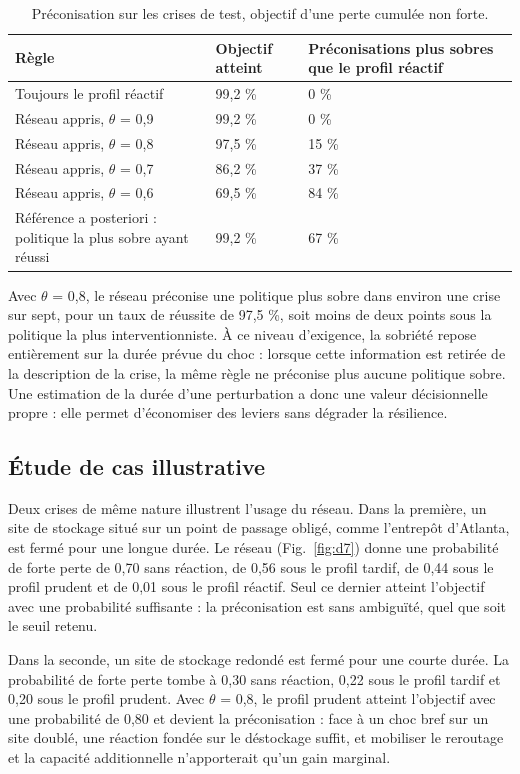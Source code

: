 \begin{table}[htbp]
\caption{Préconisation sur les crises de test, objectif d'une perte cumulée non forte.}
\label{tab:d15}
\footnotesize
\begin{tabularx}{\textwidth}{@{}LLL@{}}
\toprule
\textbf{Règle} & \textbf{Objectif atteint} & \textbf{Préconisations plus sobres que le profil réactif} \\
\midrule
Toujours le profil réactif & 99,2 \% & 0 \% \\
Réseau appris, $\theta$ = 0,9 & 99,2 \% & 0 \% \\
Réseau appris, $\theta$ = 0,8 & 97,5 \% & 15 \% \\
Réseau appris, $\theta$ = 0,7 & 86,2 \% & 37 \% \\
Réseau appris, $\theta$ = 0,6 & 69,5 \% & 84 \% \\
Référence a posteriori : politique la plus sobre ayant réussi & 99,2 \% & 67 \% \\
\bottomrule
\end{tabularx}
\end{table}

Avec $\theta$ = 0,8, le réseau préconise une politique plus sobre dans environ une crise sur sept, pour un taux de réussite de 97,5 \%, soit moins de deux points sous la politique la plus interventionniste. À ce niveau d'exigence, la sobriété repose entièrement sur la durée prévue du choc : lorsque cette information est retirée de la description de la crise, la même règle ne préconise plus aucune politique sobre. Une estimation de la durée d'une perturbation a donc une valeur décisionnelle propre : elle permet d'économiser des leviers sans dégrader la résilience.

\subsection{Étude de cas illustrative}
\label{sec:6.4}

Deux crises de même nature illustrent l'usage du réseau. Dans la première, un site de stockage situé sur un point de passage obligé, comme l'entrepôt d'Atlanta, est fermé pour une longue durée. Le réseau (Fig.~\ref{fig:d7}) donne une probabilité de forte perte de 0,70 sans réaction, de 0,56 sous le profil tardif, de 0,44 sous le profil prudent et de 0,01 sous le profil réactif. Seul ce dernier atteint l'objectif avec une probabilité suffisante : la préconisation est sans ambiguïté, quel que soit le seuil retenu.

Dans la seconde, un site de stockage redondé est fermé pour une courte durée. La probabilité de forte perte tombe à 0,30 sans réaction, 0,22 sous le profil tardif et 0,20 sous le profil prudent. Avec $\theta$ = 0,8, le profil prudent atteint l'objectif avec une probabilité de 0,80 et devient la préconisation : face à un choc bref sur un site doublé, une réaction fondée sur le déstockage suffit, et mobiliser le reroutage et la capacité additionnelle n'apporterait qu'un gain marginal.

